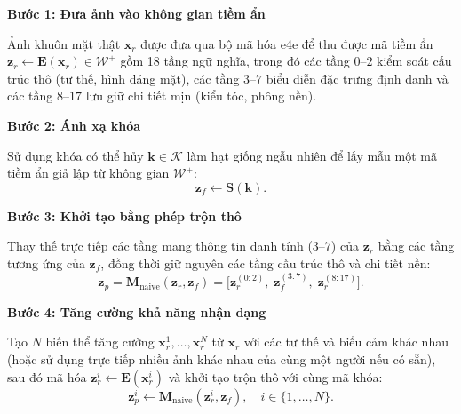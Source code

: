\documentclass[oneside,a4paper,12pt]{extarticle}
\begin{document}
\par\medskip\noindent\textbf{Bước 1: Đưa ảnh vào không gian tiềm ẩn}\par\smallskip
Ảnh khuôn mặt thật $\mathbf{x}_r$ được đưa qua bộ mã hóa e4e để thu được mã tiềm ẩn $\mathbf{z}_r \leftarrow \mathbf{E}(\mathbf{x}_r) \in \mathcal{W}^+$ gồm 18 tầng ngữ nghĩa, trong đó các tầng $0\text{--}2$ kiểm soát cấu trúc thô (tư thế, hình dáng mặt), các tầng $3\text{--}7$ biểu diễn đặc trưng định danh và các tầng $8\text{--}17$ lưu giữ chi tiết mịn (kiểu tóc, phông nền).

\par\medskip\noindent\textbf{Bước 2: Ánh xạ khóa}\par\smallskip
Sử dụng khóa có thể hủy $\mathbf{k} \in \mathcal{K}$ làm hạt giống ngẫu nhiên để lấy mẫu một mã tiềm ẩn giả lập từ không gian $\mathcal{W}^+$:
\[
\mathbf{z}_f \leftarrow \mathbf{S}(\mathbf{k}).
\]

\par\medskip\noindent\textbf{Bước 3: Khởi tạo bằng phép trộn thô}\par\smallskip
Thay thế trực tiếp các tầng mang thông tin danh tính ($3\text{--}7$) của $\mathbf{z}_r$ bằng các tầng tương ứng của $\mathbf{z}_f$, đồng thời giữ nguyên các tầng cấu trúc thô và chi tiết nền:
\begin{equation}
\mathbf{z}_p = \mathbf{M}_{\text{naive}}(\mathbf{z}_r, \mathbf{z}_f) = \bigl[\mathbf{z}_r^{(0:2)},\; \mathbf{z}_f^{(3:7)},\; \mathbf{z}_r^{(8:17)}\bigr].
\end{equation}

\par\medskip\noindent\textbf{Bước 4: Tăng cường khả năng nhận dạng}\par\smallskip
Tạo $N$ biến thể tăng cường $\mathbf{x}_r^1, \dots, \mathbf{x}_r^N$ từ $\mathbf{x}_r$ với các tư thế và biểu cảm khác nhau (hoặc sử dụng trực tiếp nhiều ảnh khác nhau của cùng một người nếu có sẵn), sau đó mã hóa $\mathbf{z}_r^i \leftarrow \mathbf{E}(\mathbf{x}_r^i)$ và khởi tạo trộn thô với cùng mã khóa:
\[
\mathbf{z}_p^i \leftarrow \mathbf{M}_{\text{naive}}(\mathbf{z}_r^i, \mathbf{z}_f), \quad i \in \{1, \dots, N\}.
\]
\end{document}
